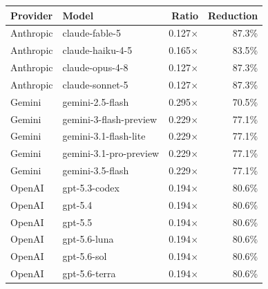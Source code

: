 \begin{tabular}{llrr}
\toprule
Provider & Model & Ratio & Reduction \\
\midrule
Anthropic & claude-fable-5 & 0.127$\times$ & 87.3\% \\
Anthropic & claude-haiku-4-5 & 0.165$\times$ & 83.5\% \\
Anthropic & claude-opus-4-8 & 0.127$\times$ & 87.3\% \\
Anthropic & claude-sonnet-5 & 0.127$\times$ & 87.3\% \\
Gemini & gemini-2.5-flash & 0.295$\times$ & 70.5\% \\
Gemini & gemini-3-flash-preview & 0.229$\times$ & 77.1\% \\
Gemini & gemini-3.1-flash-lite & 0.229$\times$ & 77.1\% \\
Gemini & gemini-3.1-pro-preview & 0.229$\times$ & 77.1\% \\
Gemini & gemini-3.5-flash & 0.229$\times$ & 77.1\% \\
OpenAI & gpt-5.3-codex & 0.194$\times$ & 80.6\% \\
OpenAI & gpt-5.4 & 0.194$\times$ & 80.6\% \\
OpenAI & gpt-5.5 & 0.194$\times$ & 80.6\% \\
OpenAI & gpt-5.6-luna & 0.194$\times$ & 80.6\% \\
OpenAI & gpt-5.6-sol & 0.194$\times$ & 80.6\% \\
OpenAI & gpt-5.6-terra & 0.194$\times$ & 80.6\% \\
\bottomrule
\end{tabular}
